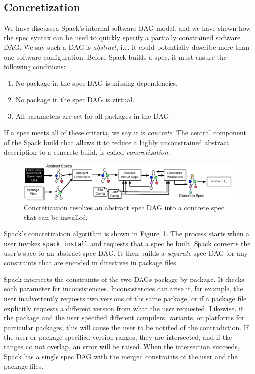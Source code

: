 
\subsection{Concretization}

We have discussed Spack's internal software DAG model, and we have shown
how the spec syntax can be used to quickly specify a partially constrained
software DAG.  We say such a DAG is {\it abstract}, i.e. it could potentially describe
more than one software configuration. Before Spack builds a spec, it
must ensure the following conditions:
\begin{enumerate}
\item No package in the spec DAG is missing dependencies.
\item No package in the spec DAG is virtual.
\item All parameters are set for all packages in the DAG.
\end{enumerate}
If a spec meets all of these criteria, we say it is {\it concrete}.
The central component of the Spack build that allows it to reduce a 
highly unconstrained abstract description to a concrete build, is
called {\it concretization}.

\begin{figure}
	\centering
	\includegraphics[width=\textwidth]{figs/concretization.pdf}
	\caption{
		Concretization resolves an abstract spec DAG into a concrete spec that can be installed.
		\label{fig:concretization}
	}
\end{figure}

Spack's concretization algorithm is shown in Figure~\ref{fig:concretization}.
The process starts when a user invokes {\tt spack install} and requests that
a spec be built.  Spack converts the user's spec to an abstract spec DAG.
It then builds a {\it separate} spec DAG for any constraints that are encoded
in directives in package files. 

Spack intersects the constraints of the two DAGs package by package.  It checks
each parameter for inconsistencies.  Inconsistencies can arise if, for example,
the user inadvertently requests two versions of the same package, or if a
package file explicitly requests a different version from what the user requested.
Likewise, if the package and the user specified different compilers, variants,
or platforms for particular packages, this will cause the user to be notified
of the contradiction. If the user or package specified version ranges, they are
intersected, and if the ranges do not overlap, an error will be raised.
When the intersection succeeds, Spack has a single spec DAG with the merged
constraints of the user and the package files.  

